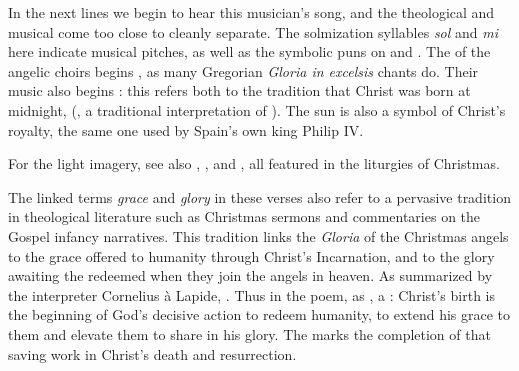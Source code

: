 In the next lines we begin to hear this musician's song, and the theological and
musical come too close to cleanly separate.
The solmization syllables \emph{sol} and \emph{mi} here indicate musical
pitches, as well as the symbolic puns on  and .
The  of the angelic choirs begins , as many
Gregorian \emph{Gloria in excelsis} chants do. 
Their music also begins : this refers both to the tradition
that Christ was born at midnight, 
(, a traditional interpretation of ).%
    \Autocite
    [37: .]
    {LuisdeGranada:Xmas}
The sun is also a symbol of Christ's royalty, the same one used by Spain's own
king Philip IV.%
\begin{Footnote}
    For the light imagery, see also , , and
    , all featured in the liturgies of Christmas.
\end{Footnote}

The linked terms \emph{grace} and \emph{glory} in these verses also refer to
a pervasive tradition in theological literature such as Christmas sermons and
commentaries on the Gospel infancy narratives.
This tradition links the \emph{Gloria} of the Christmas angels to the grace
offered to humanity through Christ's Incarnation, and to the glory awaiting the
redeemed when they join the angels in heaven.
As summarized by the interpreter Cornelius à Lapide, .%
    \Autocites
    [878, on :
    .]
    {Lapide:Gospels19C}
    [Cf.] 
    [98, Sermo 185, In Natali Domini 2, in connection with ]
    {Augustine:SermonesPL}
Thus in the poem, as , a : Christ's
birth is the beginning of God's decisive action to redeem humanity, to extend
his grace to them and elevate them to share in his glory.
The  marks the completion of that saving work in Christ's
death and resurrection.


